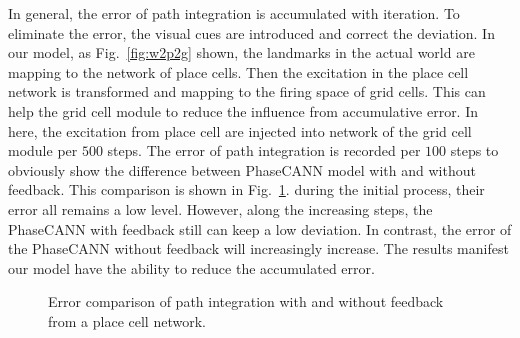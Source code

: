 \documentclass[preprint,12pt]{elsarticle}
\begin{document}
In general, the error of path integration is accumulated with iteration. To eliminate the error, the visual cues are introduced and correct the deviation. In our model, as Fig.~\ref{fig:w2p2g} shown, the landmarks in the actual world are mapping to the network of place cells. Then the excitation in the place cell network is transformed and mapping to the firing space of grid cells. This can help the grid cell module to reduce the influence from accumulative error. In here, the excitation from place cell are injected into network of the grid cell module per $500$ steps. The error of path integration is recorded per $100$ steps to obviously show the difference between PhaseCANN model with and without feedback. This comparison is shown in Fig.~\ref{fig:path_integration_feedback}. during the initial process, their error all remains a low level. However, along the increasing steps, the PhaseCANN with feedback still can keep a low deviation. In contrast, the error of the PhaseCANN without feedback will increasingly increase.  The results manifest our model have the ability to reduce the accumulated error.

\begin{figure}[!t]
	\centering
	\caption{Error comparison of path integration with and without feedback from a place cell network.  }
	\label{fig:path_integration_feedback}
\end{figure}
\end{document}
